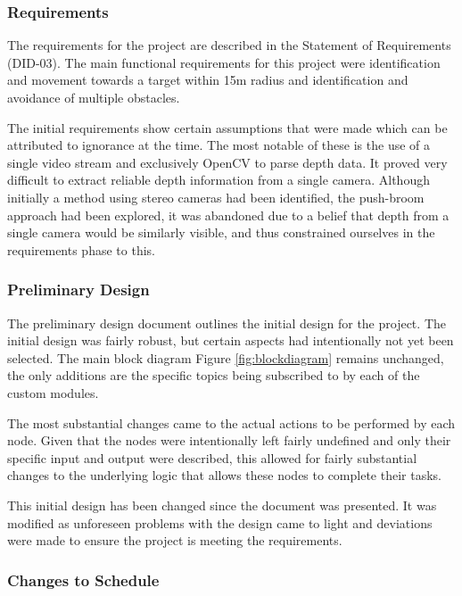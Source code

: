\documentclass{article}[12]
\begin{document}
		\subsubsection{Requirements}
		
		The requirements for the project are described in the Statement of Requirements (DID-03). \cite{sor} The main functional requirements for this project were identification and movement towards a target within 15m radius and identification and avoidance of multiple obstacles. 
	
		The initial requirements show certain assumptions that were made which can be attributed to ignorance at the time. The most notable of these is the use of a single video stream and exclusively OpenCV to parse depth data. It proved very difficult to extract reliable depth information from a single camera. Although initially a method using stereo cameras had been identified, the push-broom approach \cite{barry2015pushbroom} had been explored, it was abandoned due to a belief that depth from a single camera would be similarly visible, and thus constrained ourselves in the requirements phase to this.

		\subsubsection{Preliminary Design}
		
		The preliminary design document outlines the initial design for the project. \cite{pdd} The initial design was fairly robust, but certain aspects had intentionally not yet been selected. The main block diagram Figure \ref{fig:blockdiagram} remains unchanged, the only additions are the specific topics being subscribed to by each of the custom modules. 
		
		The most substantial changes came to the actual actions to be performed by each node. Given that the nodes were intentionally left fairly undefined and only their specific input and output were described, this allowed for fairly substantial changes to the underlying logic that allows these nodes to complete their tasks.


This initial design has been changed since the document was presented. It was modified as unforeseen problems with the design came to light and deviations were made to ensure the project is meeting the requirements.


		\subsubsection{Changes to Schedule}
	
\end{document}

